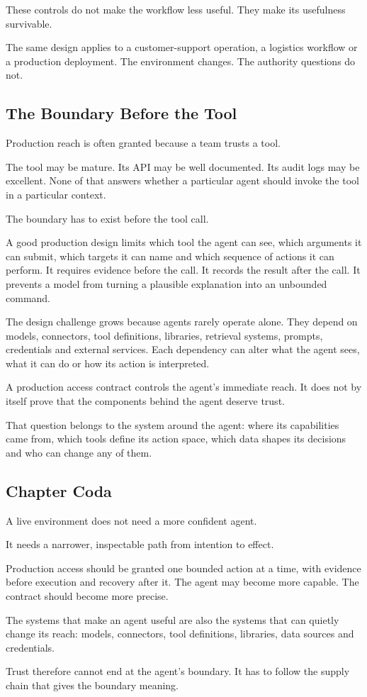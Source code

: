 These controls do not make the workflow less useful. They make its
usefulness survivable.

The same design applies to a customer-support operation, a logistics
workflow or a production deployment. The environment changes. The
authority questions do not.

\subsection{The Boundary Before the
Tool}\label{the-boundary-before-the-tool}

Production reach is often granted because a team trusts a tool.

The tool may be mature. Its API may be well documented. Its audit logs
may be excellent. None of that answers whether a particular agent should
invoke the tool in a particular context.

The boundary has to exist before the tool call.

A good production design limits which tool the agent can see, which
arguments it can submit, which targets it can name and which sequence of
actions it can perform. It requires evidence before the call. It records
the result after the call. It prevents a model from turning a plausible
explanation into an unbounded command.

The design challenge grows because agents rarely operate alone. They
depend on models, connectors, tool definitions, libraries, retrieval
systems, prompts, credentials and external services. Each dependency can
alter what the agent sees, what it can do or how its action is
interpreted.

A production access contract controls the agent's immediate reach. It
does not by itself prove that the components behind the agent deserve
trust.

That question belongs to the system around the agent: where its
capabilities came from, which tools define its action space, which data
shapes its decisions and who can change any of them.

\subsection{Chapter Coda}\label{chapter-coda}

A live environment does not need a more confident agent.

It needs a narrower, inspectable path from intention to effect.

Production access should be granted one bounded action at a time, with
evidence before execution and recovery after it. The agent may become
more capable. The contract should become more precise.

The systems that make an agent useful are also the systems that can
quietly change its reach: models, connectors, tool definitions,
libraries, data sources and credentials.

Trust therefore cannot end at the agent's boundary. It has to follow the
supply chain that gives the boundary meaning.
